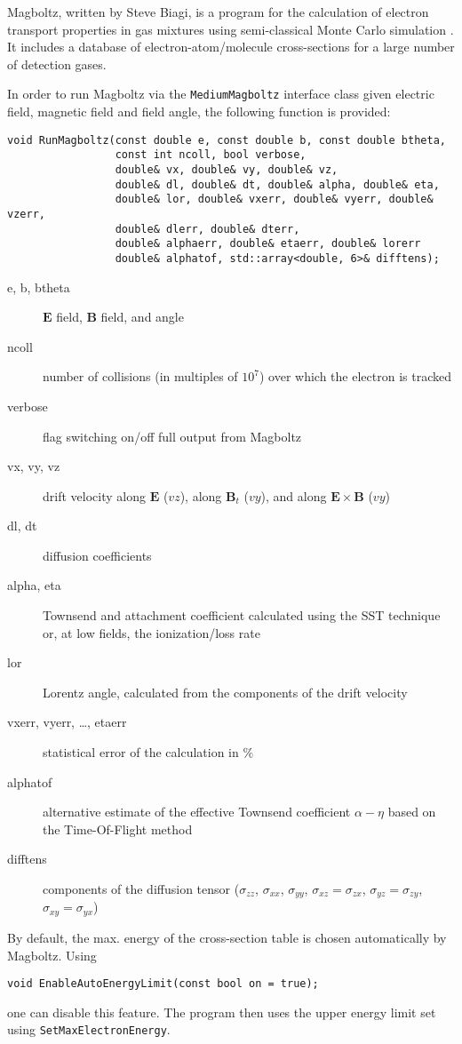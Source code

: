 Magboltz, written by Steve Biagi, is a program 
for the calculation of electron transport properties in gas 
mixtures using semi-classical Monte Carlo simulation
\cite{Biagi1999}. 
It includes a database of electron-atom/molecule cross-sections 
for a large number of detection gases. 

In order to run Magboltz via the \texttt{MediumMagboltz} interface class
given electric field, magnetic field and field angle, the following 
function is provided:
\begin{lstlisting}
void RunMagboltz(const double e, const double b, const double btheta,
                 const int ncoll, bool verbose, 
                 double& vx, double& vy, double& vz,
                 double& dl, double& dt, double& alpha, double& eta,
                 double& lor, double& vxerr, double& vyerr, double& vzerr,
                 double& dlerr, double& dterr,
                 double& alphaerr, double& etaerr, double& lorerr 
                 double& alphatof, std::array<double, 6>& difftens);
\end{lstlisting}
\begin{description}
  \item[e, b, btheta] 
    \(\mathbf{E}\) field, \(\mathbf{B}\) field, and  angle
  \item[ncoll] 
    number of collisions (in multiples of \(10^{7}\)) over which 
    the electron is tracked
  \item[verbose] 
    flag switching on/off full output from Magboltz
  \item[vx, vy, vz] 
    drift velocity along \(\mathbf{E}\) (\(vz\)), 
    along \(\mathbf{B}_{t}\) (\(vy\)), and  
    along \(\mathbf{E} \times \mathbf{B}\) (\(vy\))
  \item[dl, dt]
    diffusion coefficients
  \item[alpha, eta]
    Townsend and attachment coefficient calculated using the
    SST technique or, at low fields, the ionization/loss rate
  \item[lor]
    Lorentz angle, calculated from the components of the drift velocity
  \item[vxerr, vyerr, \dots, etaerr] 
    statistical error of the calculation in \(\%\)
  \item[alphatof]
    alternative estimate of the effective Townsend coefficient 
    \(\alpha - \eta\) based on the Time-Of-Flight method 
  \item[difftens]
    components of the diffusion tensor ($\sigma_{zz}$, $\sigma_{xx}$, 
    $\sigma_{yy}$, $\sigma_{xz} = \sigma_{zx}$, $\sigma_{yz} = \sigma_{zy}$,
    $\sigma_{xy} = \sigma_{yx}$) 
\end{description}
By default, the max. energy of the cross-section table  
is chosen automatically by Magboltz. Using
\begin{lstlisting}
void EnableAutoEnergyLimit(const bool on = true);
\end{lstlisting} 
one can disable this feature. The program then uses the upper energy 
limit set using \texttt{SetMaxElectronEnergy}. 

